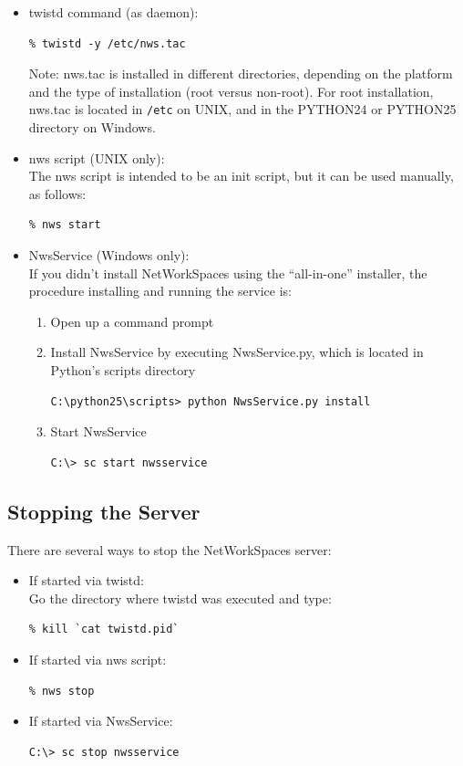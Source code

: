 \begin{itemize}
\item {twistd command (as daemon):}
\begin{verbatim}
% twistd -y /etc/nws.tac
\end{verbatim}

Note: nws.tac is installed in different directories, depending on
the platform and the type of installation (root versus non-root).
For root installation, nws.tac is located in \texttt{/etc} on UNIX,
and in the PYTHON24 or PYTHON25 directory on Windows. 
\item {nws script (UNIX only):} \\
The nws script is intended to be an init script, but it can be
used manually, as follows:
\begin{verbatim}
% nws start
\end{verbatim}
\item {NwsService (Windows only):} \\
If you didn't install NetWorkSpaces using the ``all-in-one'' installer, the
procedure installing and running the service is:
\begin{enumerate}
\item Open up a command prompt
\item Install NwsService by executing NwsService.py, which is located in Python's scripts directory
\begin{verbatim}
C:\python25\scripts> python NwsService.py install
\end{verbatim}
\item Start NwsService
\begin{verbatim}
C:\> sc start nwsservice
\end{verbatim}
\end{enumerate}
\end{itemize}

\subsection{Stopping the Server}
There are several ways to stop the NetWorkSpaces server:
\begin{itemize}
\item {If started via twistd:} \\
Go the directory where twistd was executed and type:
\begin{verbatim}
% kill `cat twistd.pid`
\end{verbatim}
\item {If started via nws script:}
\begin{verbatim}
% nws stop
\end{verbatim}
\item {If started via NwsService:}
\begin{verbatim}
C:\> sc stop nwsservice
\end{verbatim}
\end{itemize}

